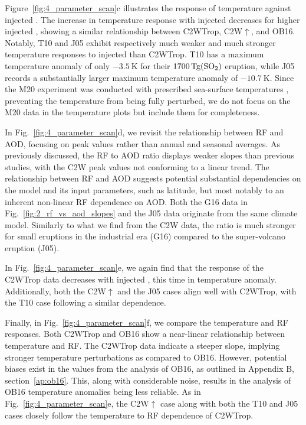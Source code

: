 \documentclass[draft]{agujournal2019}
\newcommand{\iso}[1][i]{{#1}njected \ce{SO2}}
\newcommand{\cw}{C2W}
\newcommand{\cwt}{C2WTrop}
\newcommand{\cwsn}{C2W\(\uparrow\)}
\begin{document}
Figure~\ref{fig:4_parameter_scan}c illustrates the response of temperature against
\iso{}. The increase in temperature response with \iso{} decreases for higher \iso{},
showing a similar relationship between \cwt{}, \cwsn{}, and OB16. Notably, T10 and J05
exhibit respectively much weaker and much stronger temperature responses to \iso{} than
\cwt{}. T10 has a maximum temperature anomaly of only \(\SI{-3.5}{\kelvin}\) for their
\(\SI{1700}{\tera\gram(\ce{SO2})}\) eruption, while J05 records a substantially larger
maximum temperature anomaly of \(\SI{-10.7}{\kelvin}\). Since the M20 experiment was
conducted with prescribed sea-surface temperatures \cite{marshall2020}, preventing the
temperature from being fully perturbed, we do not focus on the M20 data in the
temperature plots but include them for completeness.

In Fig.~\ref{fig:4_parameter_scan}d, we revisit the relationship between RF and AOD,
focusing on peak values rather than annual and seasonal averages. As previously
discussed, the RF to AOD ratio displays weaker slopes than previous studies, with the
\cw{} peak values not conforming to a linear trend. The relationship between RF and AOD
suggests potential substantial dependencies on the model and its input parameters, such
as latitude, but most notably to an inherent non-linear RF dependence on AOD. Both the
G16 data in Fig.~\ref{fig:2_rf_vs_aod_slopes} and the J05 data originate from the same
climate model. Similarly to what we find from the \cw{} data, the ratio is much stronger
for small eruptions in the industrial era (G16) compared to the super-volcano eruption
(J05).

In Fig.~\ref{fig:4_parameter_scan}e, we again find that the response of the \cwt{} data
decreases with \iso{}, this time in temperature anomaly. Additionally, both the \cwsn{}
and the J05 cases align well with \cwt{}, with the T10 case following a similar
dependence.

Finally, in Fig.~\ref{fig:4_parameter_scan}f, we compare the temperature and RF
responses. Both \cwt{} and OB16 show a near-linear relationship between temperature and
RF. The \cwt{} data indicate a steeper slope, implying stronger temperature
perturbations as compared to OB16. However, potential biases exist in the values from
the analysis of OB16, as outlined in Appendix B, section~\ref{ap:ob16}. This, along with
considerable noise, results in the analysis of OB16 temperature anomalies being less
reliable. As in Fig.~\ref{fig:4_parameter_scan}e, the \cwsn{} case along with both the
T10 and J05 cases closely follow the temperature to RF dependence of \cwt{}.
\end{document}
